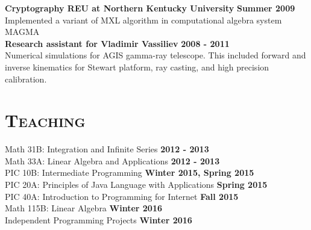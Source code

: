 \documentclass[margin, 10pt]{res} %
\begin{document}
\begin{resume}
\textbf{Cryptography REU at Northern Kentucky University} \hfill \textbf{Summer 2009}\\
Implemented a variant of MXL algorithm in computational algebra system MAGMA \\

\textbf{Research assistant for Vladimir Vassiliev} \hfill \textbf{2008 - 2011}\\
Numerical simulations for AGIS gamma-ray telescope. This included forward and inverse kinematics for Stewart platform, ray casting, and high precision calibration.

 
\section{\textsc{Teaching}}


	Math 31B: Integration and Infinite Series \hfill \textbf{2012 - 2013} \\
	Math 33A: Linear Algebra and Applications \hfill \textbf{2012 - 2013} \\
	PIC 10B: Intermediate Programming \hfill \textbf{Winter 2015,  Spring 2015} \\
	PIC 20A: Principles of Java Language with Applications \hfill \textbf{Spring 2015} \\
	PIC 40A: Introduction to Programming for Internet \hfill \textbf{Fall 2015} \\
	Math 115B: Linear Algebra \hfill \textbf{Winter 2016} \\
	Independent Programming Projects \hfill \textbf{Winter 2016}


 



\end{resume}
\end{document}
